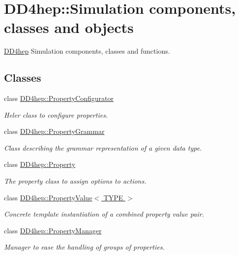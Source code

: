 \hypertarget{group___d_d4_h_e_p___s_i_m_u_l_a_t_i_o_n}{
\section{DD4hep::Simulation components, classes and objects}
\label{group___d_d4_h_e_p___s_i_m_u_l_a_t_i_o_n}
}


\hyperlink{namespace_d_d4hep}{DD4hep} Simulation components, classes and functions.  
\subsection*{Classes}
\begin{DoxyCompactItemize}
\item 
class \hyperlink{class_d_d4hep_1_1_property_configurator}{DD4hep::PropertyConfigurator}
\begin{DoxyCompactList}\small\item\em Heler class to configure properties. \item\end{DoxyCompactList}\item 
class \hyperlink{class_d_d4hep_1_1_property_grammar}{DD4hep::PropertyGrammar}
\begin{DoxyCompactList}\small\item\em Class describing the grammar representation of a given data type. \item\end{DoxyCompactList}\item 
class \hyperlink{class_d_d4hep_1_1_property}{DD4hep::Property}
\begin{DoxyCompactList}\small\item\em The property class to assign options to actions. \item\end{DoxyCompactList}\item 
class \hyperlink{class_d_d4hep_1_1_property_value}{DD4hep::PropertyValue$<$ TYPE $>$}
\begin{DoxyCompactList}\small\item\em Concrete template instantiation of a combined property value pair. \item\end{DoxyCompactList}\item 
class \hyperlink{class_d_d4hep_1_1_property_manager}{DD4hep::PropertyManager}
\begin{DoxyCompactList}\small\item\em Manager to ease the handling of groups of properties. \item\end{DoxyCompactList}\item 

\end{DoxyCompactItemize}
